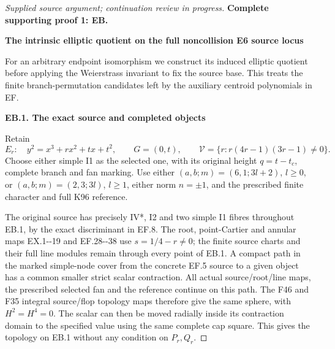 \begin{proof}[Supplied source argument; continuation review in progress]

\par\bigskip\noindent\textbf{Complete supporting proof 1: EB.}\par




\par

\medskip\noindent\textbf{The intrinsic elliptic quotient on the full noncollision E6 source locus}

\par\nobreak

For an arbitrary endpoint isomorphism we construct its induced
elliptic quotient before applying the Weierstrass invariant to fix the
source base. This treats the finite branch-permutation candidates left by
the auxiliary centroid polynomials in EF.

\par

\medskip\noindent\textbf{EB.1. The exact source and completed objects}

\par\nobreak

Retain
\[
 E_r:\quad y^2=x^3+rx^2+tx+t^2,\qquad G=(0,t),\qquad
 \mathcal V=\{r:r(4r-1)(3r-1)\ne0\}.
 \tag{EB.1}
\]
Choose either simple I1 as the selected one, with its original height
\(q=t-t_c\), complete branch and fan marking. Use either
\((a,b;m)=(6,1;3l+2)\), \(l\ge0\), or
\((a,b;m)=(2,3;3l)\), \(l\ge1\), either norm \(n=\pm1\),
and the prescribed finite character and full K96 reference.

The original source has precisely IV*, I2 and two simple I1 fibres
throughout EB.1, by the exact discriminant in EF.8. The root,
point-Cartier and annular maps EX.1-\/-19 and EF.28-\/-38 use
\(s=1/4-r\ne0\); the finite source charts and their full line
modules remain through every point of EB.1. A compact path in the
marked simple-node cover from the concrete EF.5 source to a given
object has a common smaller strict scalar contraction. All actual
source/root/line maps, the prescribed selected fan and the reference
continue on this path. The F46 and F35 integral source/flop topology
maps therefore give the same sphere, with \(H^2=H^4=0\).
The scalar can then be moved radially inside its contraction domain
to the specified value using the same complete cap square. This
gives the topology on EB.1 without any condition on \(P_r,Q_r\).


\end{proof}
